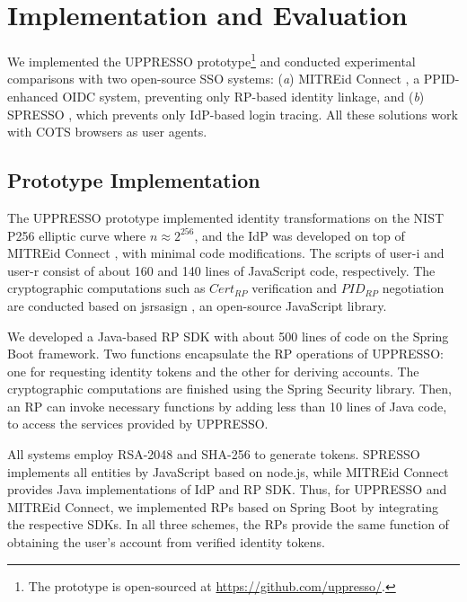 \section{Implementation and Evaluation}
\label{sec:implementation}

We implemented the UPPRESSO prototype\footnote{The prototype is open-sourced at \url{https://github.com/uppresso/}.} and conducted experimental comparisons with two open-source SSO systems:
 (\emph{a}) MITREid Connect \cite{MITREid}, a PPID-enhanced OIDC system, %
  preventing only RP-based identity linkage,
 and (\emph{b}) SPRESSO \cite{SPRESSO}, which prevents only IdP-based login tracing.
All these solutions work with COTS browsers as user agents.

\subsection{Prototype Implementation}
\label{subsec:proto-imple}

The UPPRESSO prototype implemented identity transformations on the NIST P256 elliptic curve where $n \approx 2^{256}$,
and the IdP was developed on top of MITREid Connect \cite{MITREid}, %
with minimal code modifications.
The scripts of user-i and user-r consist of about 160 and 140 lines of JavaScript code, respectively.  %
The cryptographic computations such as $Cert_{RP}$ verification and $PID_{RP}$ negotiation are conducted based on jsrsasign \cite{jsrsasign}, an open-source JavaScript library.

We developed a Java-based RP SDK with about 500 lines of code on the Spring Boot framework.
Two functions encapsulate the RP operations of UPPRESSO: one for requesting identity tokens and the other for deriving accounts. The cryptographic computations are finished using the Spring Security library.
Then, an RP can invoke necessary functions by adding less than 10 lines of Java code,
    to access the services provided by UPPRESSO.
    

All systems employ RSA-2048 and SHA-256 to generate tokens.
SPRESSO implements all entities by JavaScript based on node.js, while MITREid Connect provides Java implementations of IdP and RP SDK.
Thus, for UPPRESSO and MITREid Connect, we implemented RPs based on Spring Boot by integrating the respective SDKs. In all three schemes, the RPs provide the same function of obtaining the user's account from verified identity tokens.


